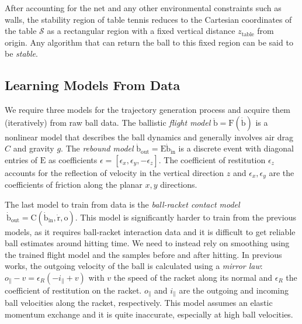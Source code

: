 \documentclass[letterpaper, 10 pt, conference]{ieeeconf}
\newcommand{\boldvec}[1]{\boldsymbol{\mathrm{#1}}}
\let\vec\boldvec
\newcommand{\ballFull}{\vec{x}_{B}} %
\newcommand{\ball}{\vec{b}} %
\newcommand{\ballDynamics}{\vec{F}} %
\newcommand{\drag}{C} %
\newcommand{\gravity}{g}
\newcommand{\bounce}{\vec{E}}
\newcommand{\contact}{\vec{C}} %
\newcommand{\racket}{\vec{r}} %
\newcommand{\orient}{\vec{o}} %
\newcommand{\court}{\mathcal{S}} %
\begin{document}
After accounting for the net and any other environmental constraints such as walls, the stability region of table tennis reduces to the Cartesian coordinates of the table $\court$ as a rectangular region with a fixed vertical distance $z_{\textrm{table}}$ from origin. Any algorithm that can return the ball to this fixed region can be said to be \emph{stable}.


\subsection{Learning Models From Data}

We require three models for the trajectory generation process and acquire them (iteratively) from raw ball data. The ballistic \emph{flight model} $\ddot{\ball} = \ballDynamics(\dot{\ball})$ is a nonlinear model that describes the ball dynamics and generally involves air drag $\drag$ and gravity $\gravity$. The \emph{rebound model} $\dot{\ball}_{\mathrm{out}} = \bounce\dot{\ball}_{\mathrm{in}}$ is a discrete event with diagonal entries of $\bounce$ as coefficients $\epsilon = [\epsilon_{x}, \epsilon_{y}, -\epsilon_{z}]$. The coefficient of restitution $\epsilon_{z}$ accounts for the reflection of velocity in the vertical direction $z$ and $\epsilon_{x}, \epsilon_{y}$ are the coefficients of friction along the planar $x,y$ directions.


The last model to train from data is the \emph{ball-racket contact model} $\ \dot{\ball}_{\mathrm{out}} = \contact(\dot{\ball}_{\mathrm{in}},\dot{\racket},\orient)$. This model is significantly harder to train from the previous models, as it requires ball-racket interaction data and it is difficult to get reliable ball estimates around hitting time. We need to instead rely on smoothing using the trained flight model and the samples before and after hitting. In previous works, the outgoing velocity of the ball is calculated using a \emph{mirror law}: $o_{\parallel} - v = \epsilon_{R} (-i_{\parallel} + v)$ with $v$ the speed of the racket along its normal and $\epsilon_{R}$ the coefficient of restitution on the racket. $o_{\parallel}$ and $i_{\parallel}$ are the outgoing and incoming ball velocities along the racket, respectively. This model assumes an elastic momentum exchange and it is quite inaccurate, especially at high ball velocities.
\end{document}
